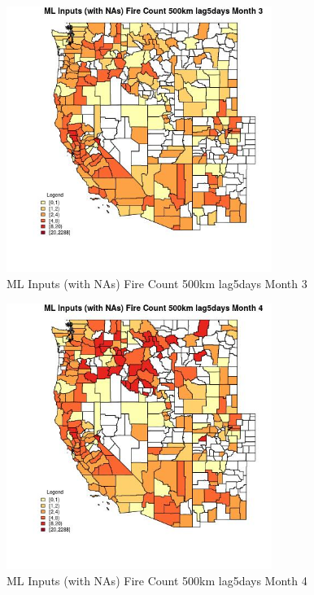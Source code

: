 \begin{figure} 
\centering  
\includegraphics[width=0.77\textwidth]{Code_Outputs/Report_ML_input_PM25_Step4_part_e_de_duplicated_aves_compiled_2019-05-20wNAs_CountyFire_Count_500km_lag5daysmedianMonth3.jpg} 
\caption{\label{fig:Report_ML_input_PM25_Step4_part_e_de_duplicated_aves_compiled_2019-05-20wNAsCountyFire_Count_500km_lag5daysmedianMonth3}ML Inputs (with NAs) Fire Count 500km lag5days Month 3} 
\end{figure} 
 

\begin{figure} 
\centering  
\includegraphics[width=0.77\textwidth]{Code_Outputs/Report_ML_input_PM25_Step4_part_e_de_duplicated_aves_compiled_2019-05-20wNAs_CountyFire_Count_500km_lag5daysmedianMonth4.jpg} 
\caption{\label{fig:Report_ML_input_PM25_Step4_part_e_de_duplicated_aves_compiled_2019-05-20wNAsCountyFire_Count_500km_lag5daysmedianMonth4}ML Inputs (with NAs) Fire Count 500km lag5days Month 4} 
\end{figure} 
 

